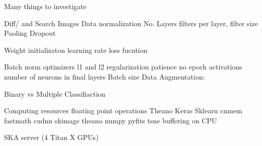 


Many things to investigate

Diff/ and Search Images
Data normalization
No. Layers
filters per layer,
filter size
Pooling 
Dropout

Weight initializaton
learning rate
loss fucntion

Batch norm
optimizers
l1 and l2 regularization
patience
no epoch
activations
number of neurons in final layers
Batch size
Data Augmentation:
	


Binary vs Multiple Classifiaction


Computing resources
floating point operations
Theano
Keras
Sklearn
cnmem
fastmath
cudnn
skimage
theano
numpy
pyfits
tsne
buffering on CPU

SKA server (4 Titan X GPUs)


